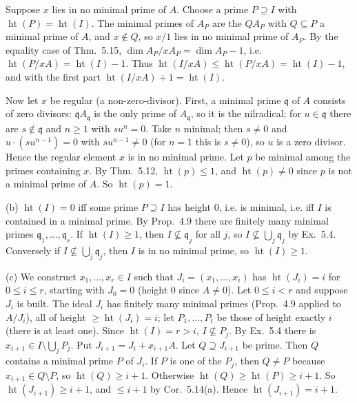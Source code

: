 \documentclass[11pt]{article}
\begin{document}
Suppose $x$ lies in no minimal prime of $A$. Choose a prime $P\supseteq I$ with $\operatorname{ht}(P)=\operatorname{ht}(I)$. The minimal primes of $A_P$ are the $QA_P$ with $Q\subseteq P$ a minimal prime of $A$, and $x\notin Q$, so $x/1$ lies in no minimal prime of $A_P$. By the equality case of Thm.~5.15, $\dim A_P/xA_P=\dim A_P-1$, i.e. $\operatorname{ht}(P/xA)=\operatorname{ht}(I)-1$. Thus $\operatorname{ht}(I/xA)\le\operatorname{ht}(P/xA)=\operatorname{ht}(I)-1$, and with the first part $\operatorname{ht}(I/xA)+1=\operatorname{ht}(I)$.

Now let $x$ be regular (a non-zero-divisor). First, a minimal prime $\mathfrak q$ of $A$ consists of zero divisors: $\mathfrak qA_{\mathfrak q}$ is the only prime of $A_{\mathfrak q}$, so it is the nilradical; for $u\in\mathfrak q$ there are $s\notin\mathfrak q$ and $n\ge1$ with $su^n=0$. Take $n$ minimal; then $s\ne0$ and $u\cdot(su^{n-1})=0$ with $su^{n-1}\ne0$ (for $n=1$ this is $s\ne0$), so $u$ is a zero divisor. Hence the regular element $x$ is in no minimal prime. Let $p$ be minimal among the primes containing $x$. By Thm.~5.12, $\operatorname{ht}(p)\le1$, and $\operatorname{ht}(p)\ne0$ since $p$ is not a minimal prime of $A$. So $\operatorname{ht}(p)=1$.

(b) $\operatorname{ht}(I)=0$ iff some prime $P\supseteq I$ has height $0$, i.e. is minimal, i.e. iff $I$ is contained in a minimal prime. By Prop.~4.9 there are finitely many minimal primes $\mathfrak q_1,\dots,\mathfrak q_s$. If $\operatorname{ht}(I)\ge1$, then $I\not\subseteq\mathfrak q_j$ for all $j$, so $I\not\subseteq\bigcup_j\mathfrak q_j$ by Ex.~5.4. Conversely if $I\not\subseteq\bigcup_j\mathfrak q_j$, then $I$ is in no minimal prime, so $\operatorname{ht}(I)\ge1$.

(c) We construct $x_1,\dots,x_r\in I$ such that $J_i=(x_1,\dots,x_i)$ has $\operatorname{ht}(J_i)=i$ for $0\le i\le r$, starting with $J_0=0$ (height $0$ since $A\neq0$). Let $0\le i<r$ and suppose $J_i$ is built. The ideal $J_i$ has finitely many minimal primes (Prop.~4.9 applied to $A/J_i$), all of height $\ge\operatorname{ht}(J_i)=i$; let $P_1,\dots,P_t$ be those of height exactly $i$ (there is at least one). Since $\operatorname{ht}(I)=r>i$, $I\not\subseteq P_j$. By Ex.~5.4 there is $x_{i+1}\in I\setminus\bigcup_jP_j$. Put $J_{i+1}=J_i+x_{i+1}A$. Let $Q\supseteq J_{i+1}$ be prime. Then $Q$ contains a minimal prime $P$ of $J_i$. If $P$ is one of the $P_j$, then $Q\ne P$ because $x_{i+1}\in Q\setminus P$, so $\operatorname{ht}(Q)\ge i+1$. Otherwise $\operatorname{ht}(Q)\ge\operatorname{ht}(P)\ge i+1$. So $\operatorname{ht}(J_{i+1})\ge i+1$, and $\le i+1$ by Cor.~5.14(a). Hence $\operatorname{ht}(J_{i+1})=i+1$.
\end{document}

